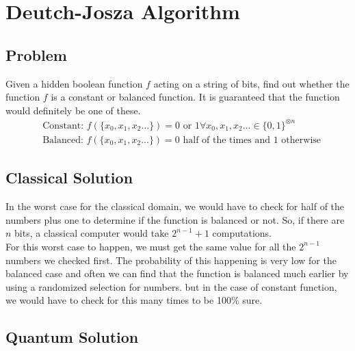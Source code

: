 \chapter{Deutch-Josza Algorithm}
\section{Problem}
Given a hidden boolean function $f$ acting on a string of bits, find out whether the function $f$ is a constant or balanced function. It is guaranteed that the function would definitely be one of these. 
\begin{equation}
\begin{split}
&\text{Constant: } f(\{x_0,x_1,x_2...\}) = 0 \text{ or } 1  \forall {x_0,x_1,x_2...} \in \{ 0,1\}^{\otimes n}\\
&\text{Balanced: } f(\{x_0,x_1,x_2...\}) = 0 \text{ half of the times and } 1 \text{ otherwise}
\end{split}
\end{equation}\section{Classical Solution}
In the worst case for the classical domain, we would have to check for half of the numbers plus one to determine if the function is balanced or not. So, if there are $n$ bits, a classical computer would take $2^{n-1}+1$ computations.\\
For this worst case to happen, we must get the same value for all the $2^{n-1} $ numbers we checked first. The probability of this happening is very low for the balanced case and often we can find that the function is balanced much earlier by using a randomized selection for numbers. but in the case of constant function, we would have to check for this many times to be 100\% sure. 
\section{Quantum Solution}


